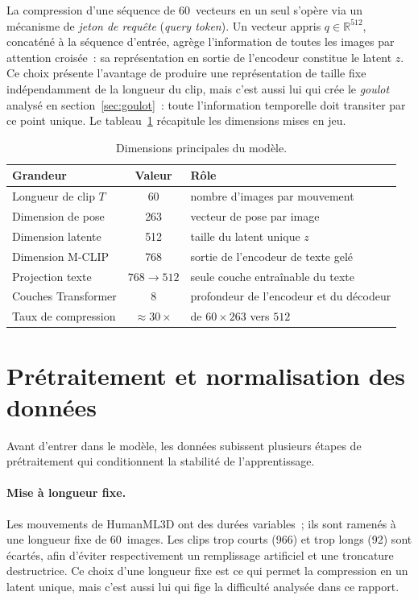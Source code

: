 \documentclass[12pt,a4paper,oneside]{report}
\theoremstyle{definition}
\theoremstyle{plain}
\newcommand{\R}{\mathbb{R}}
\begin{document}
La compression d'une séquence de 60~vecteurs en un seul s'opère via un mécanisme
de \emph{jeton de requête} (\emph{query token}). Un vecteur appris
$q\in\R^{512}$, concaténé à la séquence d'entrée, agrège l'information de toutes
les images par attention croisée~: sa représentation en sortie de l'encodeur
constitue le latent $z$. Ce choix présente l'avantage de produire une
représentation de taille fixe indépendamment de la longueur du clip, mais c'est
aussi lui qui crée le \emph{goulot} analysé en section~\ref{sec:goulot}~: toute
l'information temporelle doit transiter par ce point unique. Le tableau~\ref{tab:dims}
récapitule les dimensions mises en jeu.

\begin{table}[ht]
\centering
\caption{Dimensions principales du modèle.}
\label{tab:dims}
\small
\begin{tabular}{@{}lcl@{}}
\toprule
Grandeur & Valeur & Rôle \\
\midrule
Longueur de clip $T$ & 60 & nombre d'images par mouvement \\
Dimension de pose & 263 & vecteur de pose par image \\
Dimension latente & 512 & taille du latent unique $z$ \\
Dimension M-CLIP & 768 & sortie de l'encodeur de texte gelé \\
Projection texte & $768\rightarrow512$ & seule couche entraînable du texte \\
Couches Transformer & 8 & profondeur de l'encodeur et du décodeur \\
Taux de compression & $\approx30\times$ & de $60{\times}263$ vers $512$ \\
\bottomrule
\end{tabular}
\end{table}

\section{Prétraitement et normalisation des données}
\label{sec:pretraitement}

Avant d'entrer dans le modèle, les données subissent plusieurs étapes de
prétraitement qui conditionnent la stabilité de l'apprentissage.

\paragraph{Mise à longueur fixe.} Les mouvements de HumanML3D ont des durées
variables~; ils sont ramenés à une longueur fixe de 60~images. Les clips trop
courts (966) et trop longs (92) sont écartés, afin d'éviter respectivement un
remplissage artificiel et une troncature destructrice. Ce choix d'une longueur
fixe est ce qui permet la compression en un latent unique, mais c'est aussi lui
qui fige la difficulté analysée dans ce rapport.
\end{document}
